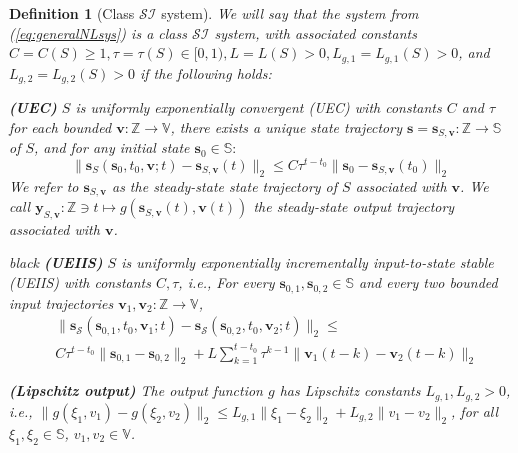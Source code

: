 \documentclass{ifacconf}
\def\eqref#1{(\ref{#1})}
\def\rvs{{\mathbf{s}}}
\def\rvv{{\mathbf{v}}}
\def\rvy{{\mathbf{y}}}
\def\vs{{\bm{s}}}
\def\vv{{\bm{v}}}
\def\sS{{\mathbb{S}}}
\def\sV{{\mathbb{V}}}
\def\sZ{{\mathbb{Z}}}
\newtheorem{Definition}{Definition}[section]
\newcommand{\class}{\(\mathcal{SI}\)}
\begin{document}
\begin{Definition}[Class \class{} system] \label{def:classDef}
We will say that the system from \eqref{eq:generalNLsys} is a class \class{} system, %
with associated constants $C=C(S)\geq 1,\tau=\tau(S)\in[0,1),L=L(S)>0,L_{g,1}=L_{g,1}(S)>0$, and $L_{g,2}=L_{g,2}(S)>0$ if the following holds:

\textbf{(UEC)} $S$ is \emph{uniformly exponentially convergent (UEC) with constants $C$ and $\tau$}
   for each bounded $\vv:\sZ \rightarrow \sV$, there exists a unique state trajectory $\vs=\vs_{S,\vv}: \sZ \rightarrow \sS$ of $S$,
        and for any initial state $\vs_0 \in \mathbb{S}:$
        \begin{equation*}
            \|\vs_S(\vs_0,t_0,\vv;t)-\vs_{S,\vv}(t)\|_2\leq C\tau^{t-t_0}\|\vs_0-\vs_{S,\vv}(t_0)\|_2
        \end{equation*}
   We refer to $\rvs_{S,\rvv}$     
as the \emph{steady-state state trajectory}
of $S$ associated with $\rvv$.
We call
$\rvy_{S,\rvv}:\sZ \ni t \mapsto g(\rvs_{S,\rvv}(t),\rvv(t))$
the \emph{steady-state output trajectory} associated with $\rvv$.

\begin{color}{black}
\textbf{(UEIIS)} $S$ is \emph{uniformly exponentially incrementally input-to-state stable (UEIIS) with constants $C,\tau$}, i.e.,
  For every $\vs_{0,1},\vs_{0,2} \in \sS$  and every two bounded input trajectories $\vv_1,\vv_2:\sZ \rightarrow \sV$,
  \[ 
    \begin{split}
     & \|\vs_{\mathcal{S}}(\vs_{0,1},t_0,\vv_1;t)-\vs_{\mathcal{S}}(\vs_{0,2},t_0,\vv_2;t)\|_2\leq \\ 
     & C\tau^{t-t_0}\|\vs_{0,1}-\vs_{0,2}\|_2  
      + L\sum_{k=1}^{t-t_0} \tau^{k-1} \|\vv_1(t-k)-\vv_2(t-k)\|_2
  \end{split}
  \]
\end{color}
\textbf{(Lipschitz output)}
    The output function $g$ %
    has Lipschitz  constants $L_{g,1},L_{g,2}>0$, i.e.,
     \(   \|g(\xi_1,v_1)-g(\xi_2,v_2)\|_2\leq L_{g,1}\|\xi_1-\xi_2\|_2+L_{g,2}\|v_1-v_2\|_2 \), 
     for all $\xi_1,\xi_2 \in \sS$, $v_1,v_2 \in \sV$.
\end{Definition}
\end{document}
